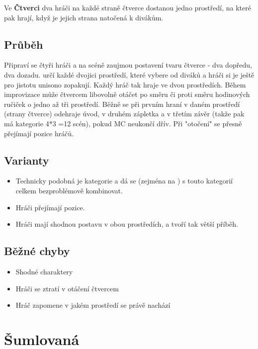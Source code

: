 \documentclass[main.tex]{subfiles}
\begin{document}
Ve \textbf{Čtverci}{} dva hráči na každé straně čtverce dostanou jedno prostředí, na které pak hrají, když je jejich strana natočená k divákům. 
 
\subsection{Průběh} Připraví se čtyři hráči a na scéně zaujmou postavení tvaru čtverce - dva dopředu, dva dozadu.  určí každé dvojici prostředí, které vybere od diváků a hráči si je ještě pro jistotu unisono zopakují. Každý hráč tak hraje ve dvou prostředích. Během improvizace  může čtvercem libovolně otáčet po směru či proti směru hodinových ručiček o jedno až tři prostředí. Běžně se při prvním hraní v daném prostředí (strany čtverce) odehraje úvod, v druhém zápletka a v třetím závěr (takže pak má kategorie 4*3 =12 scén), pokud MC neukončí dřív. 
Při "otočení"{} se přesně přejímají pozice hráčů. 
 
\subsection{ Varianty} \begin{itemize}
\item Technicky podobná je kategorie  a dá se (zejména na ) s touto kategorií celkem bezproblémově kombinovat.
\item Hráči přejímají pozice.
\item Hráči mají shodnou postavu v obou prostředích, a tvoří tak větší příběh.
\end{itemize}
 
\subsection{Běžné chyby} \begin{itemize}
\item Shodné charaktery
\item Hráči se ztratí v otáčení čtvercem
\item Hráč zapomene v jakém prostředí se právě nachází
\end{itemize}
 
 
 
 
 
\needspace{5cm} \section{Šumlovaná} \label{šumlovaná}  
 
\end{document}
